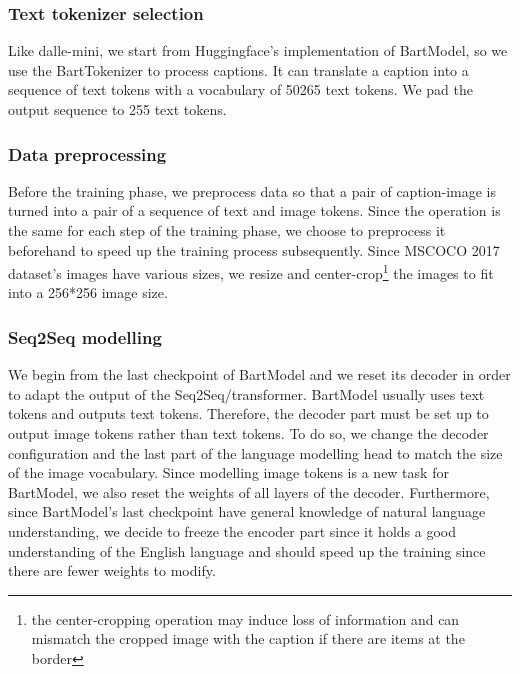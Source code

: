 \documentclass{article}
\begin{document}
\subsubsection{Text tokenizer selection}
Like dalle-mini, we start from Huggingface's implementation of BartModel, so we use the BartTokenizer to process captions. It can translate a caption into a sequence of text tokens with a vocabulary of 50265 text tokens. We pad the output sequence to 255 text tokens.

\subsubsection{Data preprocessing}
Before the training phase, we preprocess data so that a pair of caption-image is turned into a pair of a sequence of text and image tokens. Since the operation is the same for each step of the training phase, we choose to preprocess it beforehand to speed up the training process subsequently. Since MSCOCO 2017 dataset's images have various sizes, we resize and center-crop\footnote{the center-cropping operation may induce loss of information and can mismatch the cropped image with the caption if there are items at the border} the images to fit into a 256*256 image size.

\subsubsection{Seq2Seq modelling}
We begin from the last checkpoint of BartModel and we reset its decoder in order to adapt the output of the Seq2Seq/transformer. BartModel usually uses text tokens and outputs text tokens. Therefore, the decoder part must be set up to output image tokens rather than text tokens. To do so, we change the decoder configuration and the last part of the language modelling head to match the size of the image vocabulary. Since modelling image tokens is a new task for BartModel, we also reset the weights of all layers of the decoder.
Furthermore, since BartModel's last checkpoint have general knowledge of natural language understanding, we decide to freeze the encoder part since it holds a good understanding of the English language and should speed up the training since there are fewer weights to modify.
\end{document}
